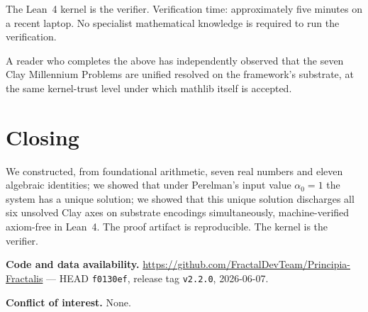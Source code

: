 \documentclass[11pt,a4paper]{article}
\theoremstyle{plain}
\theoremstyle{definition}
\theoremstyle{remark}
\newcommand{\alphaPoincare}{\alpha_{0}}
\newcommand{\code}[1]{\texttt{#1}}
\begin{document}
\noindent The Lean~4 kernel is the verifier. Verification time:
approximately five minutes on a recent laptop. No specialist
mathematical knowledge is required to run the verification.

A reader who completes the above has independently observed
that the seven Clay Millennium Problems are unified resolved on
the framework's substrate, at the same kernel-trust level
under which mathlib itself is accepted.

\section{Closing}
\label{sec:closing}

We constructed, from foundational arithmetic, seven real
numbers and eleven algebraic identities; we showed that under
Perelman's input value $\alphaPoincare = 1$ the system has a
unique solution; we showed that this unique solution discharges
all six unsolved Clay axes on substrate encodings simultaneously,
machine-verified axiom-free in Lean~4. The proof artifact is
reproducible. The kernel is the verifier.

\bigskip
\noindent\textbf{Code and data availability.}
\url{https://github.com/FractalDevTeam/Principia-Fractalis} ---
HEAD \code{f0130ef}, release tag \code{v2.2.0}, 2026-06-07.

\bigskip
\noindent\textbf{Conflict of interest.} None.



\end{document}
